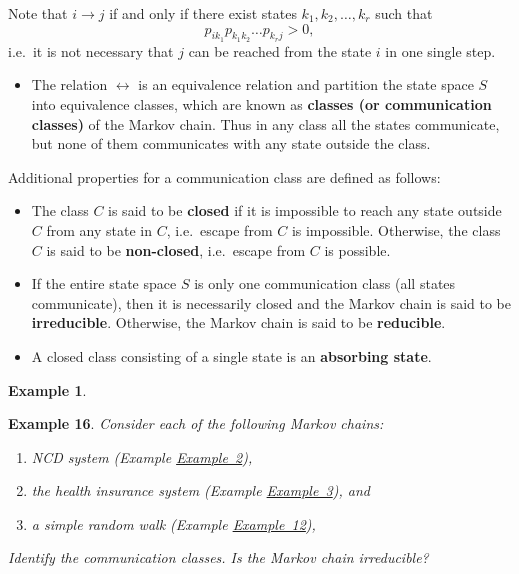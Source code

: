 \documentclass[
]{book}
\providecommand{\tightlist}{%
  \setlength{\itemsep}{0pt}\setlength{\parskip}{0pt}}
\theoremstyle{definition}
\theoremstyle{definition}
\newtheorem{example}{Example}[chapter]
\theoremstyle{definition}
\theoremstyle{definition}
\theoremstyle{remark}
\begin{document}
Note that \(i \rightarrow j\) if and only if there exist states
\(k_1, k_2, \ldots, k_r\) such that
\[p_{ik_1} p_{k_1k_2} \ldots p_{k_r j}>0,\] i.e.~it is not necessary
that \(j\) can be reached from the state \(i\) in one single step.

\begin{itemize}
\tightlist
\item
  The relation \(\leftrightarrow\) is an equivalence relation and
  partition the state space \(S\) into equivalence classes, which are
  known as \textbf{classes (or communication classes)} of the Markov chain.
  Thus in any class all the states communicate, but none of them
  communicates with any state outside the class.
\end{itemize}

Additional properties for a communication class are defined as follows:

\begin{itemize}
\tightlist
\item
  The class \(C\) is said to be \textbf{closed} if it is impossible to reach
  any state outside \(C\) from any state in \(C\), i.e.~escape from \(C\) is
  impossible. Otherwise, the class \(C\) is said to be \textbf{non-closed},
  i.e.~escape from \(C\) is possible.
\end{itemize}

\begin{itemize}
\item
  If the entire state space \(S\) is only one communication class (all
  states communicate), then it is necessarily closed and the Markov
  chain is said to be \textbf{irreducible}. Otherwise, the Markov chain is
  said to be \textbf{reducible}.
\item
  A closed class consisting of a single state is an \textbf{absorbing
  state}.
\end{itemize}

\begin{example}
\protect\hypertarget{exm:unlabeled-div-23}{}\label{exm:unlabeled-div-23}

\textbf{Example 16}. \emph{Consider each of the following Markov chains:}

\begin{enumerate}
\def\labelenumi{(\alph{enumi})}
\item
  \emph{NCD system (Example \protect\hyperlink{NCD}{Example~2}),}
\item
  \emph{the health insurance system (Example
  \protect\hyperlink{healthInsurance}{Example~3}), and}
\item
  \emph{a simple random walk (Example
  \protect\hyperlink{simpleRW}{Example~12}),}
\end{enumerate}

\emph{Identify the communication classes. Is the Markov chain irreducible?}

\end{example}
\end{document}
